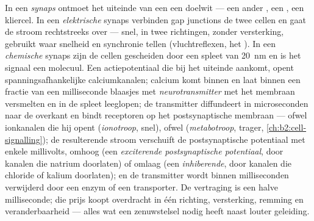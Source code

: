 \begin{definition}\label{def:b2:neurons-synapses:synapse}
In een \emph{synaps} ontmoet het uiteinde van een  een doelwit --- een
ander , een , een kliercel. In een \emph{elektrische}
synaps verbinden gap junctions de twee cellen en gaat de stroom
rechtstreeks over --- snel, in twee richtingen, zonder versterking, gebruikt
waar snelheid en synchronie tellen (vluchtreflexen, het ). In een
\emph{chemische} synaps zijn de cellen gescheiden door een spleet van
\qty{20}{nm} en is het signaal een molecuul. Een actiepotentiaal die bij het
uiteinde aankomt, opent spanningsafhankelijke calciumkanalen; calcium komt
binnen en laat binnen een fractie van een milliseconde blaasjes met
\emph{neurotransmitter} met het membraan versmelten en in de spleet leeglopen;
de transmitter diffundeert in microseconden naar de overkant en bindt
receptoren op het postsynaptische membraan --- ofwel ionkanalen die hij opent
(\emph{ionotroop}, snel), ofwel 
(\emph{metabotroop}, trager, \cref{ch:b2:cell-signalling}); de
resulterende stroom verschuift de postsynaptische potentiaal met enkele
millivolts, omhoog (een \emph{exciterende postsynaptische potentiaal}, door
kanalen die natrium doorlaten) of omlaag (een \emph{inhiberende}, door
kanalen die chloride of kalium doorlaten); en de transmitter wordt binnen
milliseconden verwijderd door een enzym of een transporter. De vertraging is
een halve milliseconde; die prijs koopt overdracht in één richting,
versterking, remming en veranderbaarheid --- alles wat een zenuwstelsel nodig
heeft naast louter geleiding.
\end{definition}


